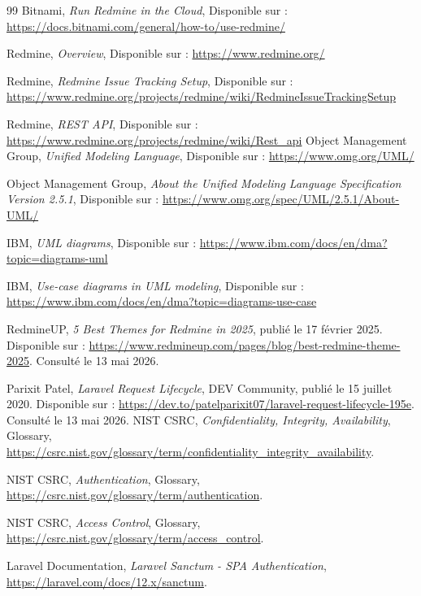 \begin{thebibliography}{99}
Bitnami,
\textit{Run Redmine in the Cloud},
Disponible sur :
\url{https://docs.bitnami.com/general/how-to/use-redmine/}

Redmine,
\textit{Overview},
Disponible sur :
\url{https://www.redmine.org/}

Redmine,
\textit{Redmine Issue Tracking Setup},
Disponible sur :
\url{https://www.redmine.org/projects/redmine/wiki/RedmineIssueTrackingSetup}

Redmine,
\textit{REST API},
Disponible sur :
\url{https://www.redmine.org/projects/redmine/wiki/Rest_api}
Object Management Group,
\textit{Unified Modeling Language},
Disponible sur :
\url{https://www.omg.org/UML/}

Object Management Group,
\textit{About the Unified Modeling Language Specification Version 2.5.1},
Disponible sur :
\url{https://www.omg.org/spec/UML/2.5.1/About-UML/}

IBM,
\textit{UML diagrams},
Disponible sur :
\url{https://www.ibm.com/docs/en/dma?topic=diagrams-uml}

IBM,
\textit{Use-case diagrams in UML modeling},
Disponible sur :
\url{https://www.ibm.com/docs/en/dma?topic=diagrams-use-case}

RedmineUP, \textit{5 Best Themes for Redmine in 2025}, publié le 17 février 2025. Disponible sur : 
\url{https://www.redmineup.com/pages/blog/best-redmine-theme-2025}. Consulté le 13 mai 2026.

Parixit Patel, \textit{Laravel Request Lifecycle}, DEV Community, publié le 15 juillet 2020. Disponible sur :
\url{https://dev.to/patelparixit07/laravel-request-lifecycle-195e}. Consulté le 13 mai 2026.
NIST CSRC, \textit{Confidentiality, Integrity, Availability}, Glossary,
\url{https://csrc.nist.gov/glossary/term/confidentiality_integrity_availability}.

NIST CSRC, \textit{Authentication}, Glossary,
\url{https://csrc.nist.gov/glossary/term/authentication}.

NIST CSRC, \textit{Access Control}, Glossary,
\url{https://csrc.nist.gov/glossary/term/access_control}.

Laravel Documentation, \textit{Laravel Sanctum - SPA Authentication},
\url{https://laravel.com/docs/12.x/sanctum}.


\end{thebibliography}
